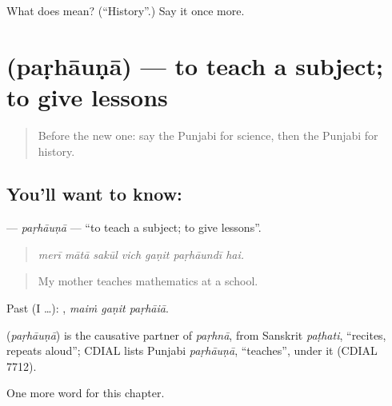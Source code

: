 \begin{tcolorbox}[breakable,colback=teal!4,colframe=teal!35!black,title={Before you move on}]
What does  mean? (\textquotedblleft{}History\textquotedblright{}.) Say it once more.
\end{tcolorbox}
\section[\texorpdfstring{\pa{ਪੜ੍ਹਾਉਣਾ} (paṛhāuṇā)}{ਪੜ੍ਹਾਉਣਾ (paṛhāuṇā)}]{ (paṛhāuṇā) — to teach a subject; to give lessons}

\label{lesson:PA-C358-parhauna}



\begin{quote}
Before the new one: say the Punjabi for science, then the Punjabi for history.
\end{quote}

\subsection*{You'll want to know: }
\textbf{} — \emph{paṛhāuṇā} — \textquotedblleft{}to teach a subject; to give lessons\textquotedblright{}.

\begin{quote}
      
\end{quote}

\begin{quote}
\emph{merī mātā sakūl vich gaṇit paṛhāundī hai.}
\end{quote}

\begin{quote}
My mother teaches mathematics at a school.
\end{quote}

Past (I …):   , \emph{maiṁ gaṇit paṛhāiā}.

\begin{cousinweb}
\textbf{} (\emph{paṛhāuṇā}) is the causative partner of \emph{paṛhnā}, from Sanskrit \emph{paṭhati}, \textquotedblleft{}recites, repeats aloud\textquotedblright{}; CDIAL lists Punjabi \emph{paṛhāuṇā}, \textquotedblleft{}teaches\textquotedblright{}, under it (CDIAL 7712).
\end{cousinweb}

\begin{grammarlens}[title={What you've built}]
One more word for this chapter.
\end{grammarlens}

